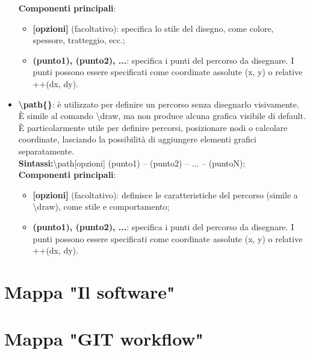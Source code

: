 \documentclass[portrait,a4paper]{article} %
\begin{document}
\begin{itemize}
    \textbf{Componenti principali}:
        \begin{itemize}
            \item \textbf{[opzioni]} (facoltativo): specifica lo stile del disegno, come colore, spessore, tratteggio, ecc.;
            \item \textbf{(punto1), (punto2), ...}: specifica i punti del percorso da disegnare. I punti possono essere specificati come coordinate assolute (x, y) o relative ++(dx, dy).
        \end{itemize}
    \item \textbf{\textbackslash path\{\}}: è utilizzato per definire un percorso senza disegnarlo visivamente. È simile al comando \textbackslash draw, ma non produce alcuna grafica visibile di default. È particolarmente utile per definire percorsi, posizionare nodi o calcolare coordinate, lasciando la possibilità di aggiungere elementi grafici separatamente.\\
    \textbf{Sintassi:}\textbackslash path[opzioni] (punto1) -- (punto2) -- ... -- (puntoN);\\
    \textbf{Componenti principali}:
        \begin{itemize}
            \item \textbf{[opzioni]} (facoltativo): definisce le caratteristiche del percorso (simile a \textbackslash draw), come stile e comportamento;
            \item \textbf{(punto1), (punto2), ...}: specifica i punti del percorso da disegnare. I punti possono essere specificati come coordinate assolute (x, y) o relative ++(dx, dy).
        \end{itemize}
\end{itemize}

\newpage
{}

\section{Mappa "Il software"}

\flushleft
\resizebox{7.2in}{!}{
    
}

\newpage
{}

\section{Mappa "GIT workflow"} 
\end{document}
